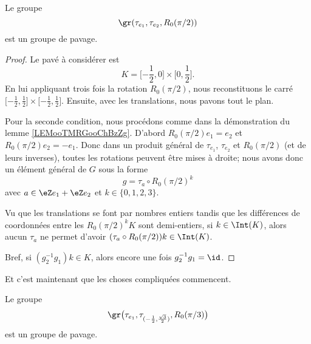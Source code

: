 \newcommand{\CaptionFigATJSooefYkmCbP}{Le compact \( K\) et son image par \( R_0(\pi)\) pour le lemme \ref{LEMooTMRGooChBzZg}.}


\begin{lemma}         \label{LEMooJPNDooHDCLnY}
	Le groupe
	\begin{equation}
		\gr(\tau_{e_1}, \tau_{e_2}, R_0(\pi/2))
	\end{equation}
	est un groupe de pavage.
\end{lemma}

\begin{proof}
	Le pavé à considérer est
	\begin{equation}
		K=\mathopen[ -\frac{ 1 }{2} , 0 \mathclose]\times \mathopen[ 0 , \frac{ 1 }{2} \mathclose].
	\end{equation}
	En lui appliquant trois fois la rotation \( R_0(\pi/2)\), nous reconstituons le carré \( \mathopen[ -\frac{ 1 }{2} , \frac{ 1 }{2} \mathclose]\times \mathopen[ -\frac{ 1 }{2} , \frac{ 1 }{2} \mathclose]\). Ensuite, avec les translations, nous pavons tout le plan.

	Pour la seconde condition, nous procédons comme dans la démonstration du lemme \ref{LEMooTMRGooChBzZg}. D'abord \( R_0(\pi/2)e_1=e_2\) et \( R_0(\pi/2)e_2=-e_1\). Donc dans un produit général de \( \tau_{e_1}\), \( \tau_{e_2}\) et \( R_0(\pi/2)\) (et de leurs inverses), toutes les rotations peuvent être mises à droite; nous avons donc un élément général de \( G\) sous la forme
	\begin{equation}
		g=\tau_a\circ R_0(\pi/2)^k
	\end{equation}
	avec \( a\in \eZ e_1+\eZ e_2\) et \( k\in \{ 0,1,2,3 \}\).

	Vu que les translations se font par nombres entiers tandis que les différences de coordonnées entre les \( R_0(\pi/2)^kK\) sont demi-entiers, si \( k\in \Int(K)\), alors aucun \( \tau_a\) ne permet d'avoir \( (\tau_a\circ R_0(\pi/2))k\in \Int(K)\).

	Bref, si \( (g_2^{-1}g_1)k\in K\), alors encore une fois \( g_2^{-1}g_1=\id\).
\end{proof}

Et c'est maintenant que les choses compliquées commencent.

\begin{lemma}       \label{LEMooMWWEooEbZXtb}
	Le groupe
	\begin{equation}
		\gr\big( \tau_{e_1},\tau_{(-\frac{ 1 }{2},\frac{ \sqrt{ 3 } }{2})},R_0(\pi/3) \big)
	\end{equation}
	est un groupe de pavage.
\end{lemma}

